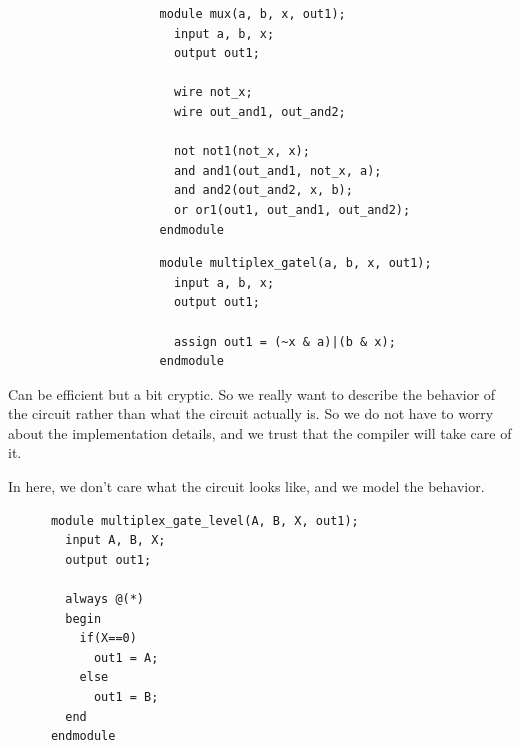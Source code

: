   \begin{definition}
    \label{def:structural-implementation-of-multiplexor}
    \begin{figure}[H]
      \centering
      \begin{subfigure}[b]{0.48\textwidth}
        \centering
        \begin{lstlisting}
          module mux(a, b, x, out1); 
            input a, b, x; 
            output out1; 

            wire not_x; 
            wire out_and1, out_and2; 

            not not1(not_x, x); 
            and and1(out_and1, not_x, a); 
            and and2(out_and2, x, b); 
            or or1(out1, out_and1, out_and2); 
          endmodule
        \end{lstlisting}
        \caption{}
      \end{subfigure}
      \hfill 
      \begin{subfigure}[b]{0.48\textwidth}
        \centering
        \begin{lstlisting}
          module multiplex_gatel(a, b, x, out1); 
            input a, b, x; 
            output out1; 

            assign out1 = (~x & a)|(b & x);
          endmodule
        \end{lstlisting}
        \caption{}
      \end{subfigure}
      \caption{}
    \end{figure}
  \end{definition}

  Can be efficient but a bit cryptic. So we really want to describe the behavior of the circuit rather than what the circuit actually is. So we do not have to worry about the implementation details, and we trust that the compiler will take care of it. 

  \begin{example}
    \label{ex:behavioral-level-implementation-of-multiplexor}
    In here, we don't care what the circuit looks like, and we model the behavior. 
    \begin{lstlisting}
      module multiplex_gate_level(A, B, X, out1); 
        input A, B, X; 
        output out1; 

        always @(*)
        begin
          if(X==0) 
            out1 = A; 
          else 
            out1 = B; 
        end
      endmodule
    \end{lstlisting}
  \end{example}

